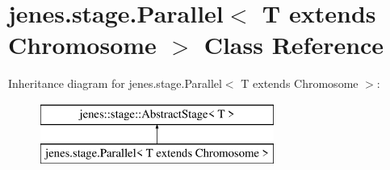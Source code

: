 \hypertarget{classjenes_1_1stage_1_1_parallel_3_01_t_01extends_01_chromosome_01_4}{\section{jenes.\-stage.\-Parallel$<$ T extends Chromosome $>$ Class Reference}
\label{classjenes_1_1stage_1_1_parallel_3_01_t_01extends_01_chromosome_01_4}
}
Inheritance diagram for jenes.\-stage.\-Parallel$<$ T extends Chromosome $>$\-:\begin{figure}[H]
\begin{center}
\leavevmode
\includegraphics[height=2.000000cm]{classjenes_1_1stage_1_1_parallel_3_01_t_01extends_01_chromosome_01_4}
\end{center}
\end{figure}
